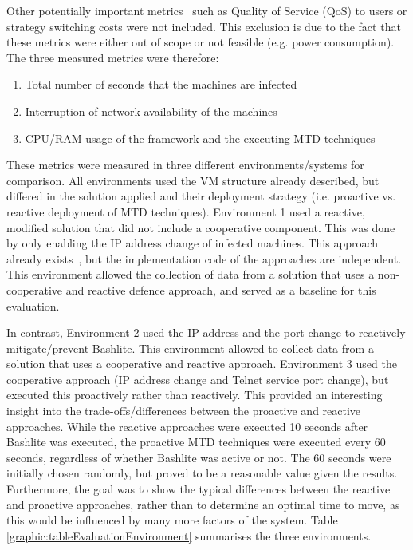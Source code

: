 Other potentially important metrics~\cite{article:surveyMTD} such as Quality of Service (QoS) to users or strategy switching costs were not included. This exclusion is due to the fact that these metrics were either out of scope or not feasible (e.g. power consumption). The three measured metrics were therefore:
\begin{enumerate}
    \item Total number of seconds that the machines are infected 
    \item Interruption of network availability of the machines
    \item CPU/RAM usage of the framework and the executing MTD techniques

\end{enumerate}

These metrics were measured in three different environments/systems for comparison. All environments used the VM structure already described, but differed in the solution applied and their deployment strategy (i.e. proactive vs. reactive deployment of MTD techniques). Environment 1 used a reactive, modified solution that did not include a cooperative component. This was done by only enabling the IP address change of infected machines. This approach already exists~\cite{article:vonderAssen}, but the implementation code of the approaches are independent. This environment allowed the collection of data from a solution that uses a non-cooperative and reactive defence approach, and served as a baseline for this evaluation. 

In contrast, Environment 2 used the IP address and the port change to reactively mitigate/prevent Bashlite. This environment allowed to collect data from a solution that uses a cooperative and reactive approach. Environment 3 used the cooperative approach (IP address change and Telnet service port change), but executed this proactively rather than reactively. This provided an interesting insight into the trade-offs/differences between the proactive and reactive approaches. While the reactive approaches were executed 10 seconds after Bashlite was executed, the proactive MTD techniques were executed every 60 seconds, regardless of whether Bashlite was active or not. The 60 seconds were initially chosen randomly, but proved to be a reasonable value given the results. Furthermore, the goal was to show the typical differences between the reactive and proactive approaches, rather than to determine an optimal time to move, as this would be influenced by many more factors of the system. Table \ref{graphic:tableEvaluationEnvironment} summarises the three environments.

